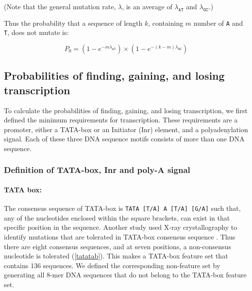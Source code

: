 \documentclass[12pt,a4paper]{article}
\begin{document}
(Note that the general mutation rate, $\lambda$, is an average of $\lambda_\texttt{AT}$ and $\lambda_\texttt{GC}$.)

\vspace{1\baselineskip}

Thus the probability that a sequence of length $k$, containing $m$ number of \texttt{A} and \texttt{T}, does not mutate is:

\vspace{-1ex}

$$P_0 = (1-e^{-m\lambda_\texttt{AT}})\times(1-e^{-(k-m)\lambda_\texttt{GC}})$$

\subsection{Probabilities of finding, gaining, and losing transcription}

To calculate the probabilities of finding, gaining, and losing transcription, we first defined the minimum requirements for transcription. These requirements are a promoter, either a TATA-box or an Initiator (Inr) element, and a polyadenylation signal. Each of these three DNA sequence motifs consists of more than one DNA sequence.

\subsubsection{Definition of TATA-box, Inr and poly-A signal}

\paragraph{TATA box:}

The consensus sequence of TATA-box is \texttt{TATA [T/A] A [T/A] [G/A]} \citep{tata2} such that, any of the nucleotides enclosed within the square brackets, can exist in that specific position in the sequence. Another study used X-ray crystallography to identify mutations that are tolerated in TATA-box consensus sequence \citep{tata1}. Thus there are eight consensus sequences, and at seven positions, a non-consensus nucleotide is tolerated (\autoref{tatatab}). This makes a TATA-box feature set that contains 136 sequences. We defined the corresponding non-feature set by generating all 8-mer DNA sequences that do not belong to the TATA-box feature set.
\end{document}
